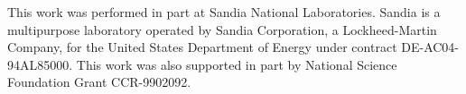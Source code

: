 This work was performed in part at Sandia National
Laboratories. Sandia is a multipurpose laboratory operated by Sandia
Corporation, a Lockheed-Martin Company, for the United States
Department of Energy under contract DE-AC04-94AL85000.  This work was
also supported in part by National Science Foundation Grant
CCR-9902092.
